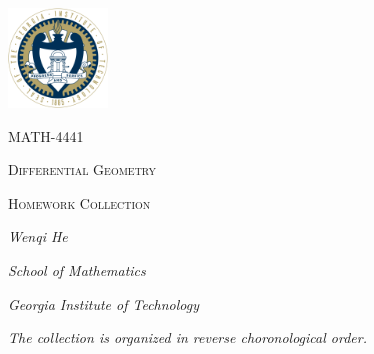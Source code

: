 \documentclass[10pt]{article}
\begin{document}
\begin{titlepage}
	\centering
	\par\vspace{5cm}
	\includegraphics[width=100px]{logo.png}\par
	\vspace{3cm}
	{\scshape\Large MATH-4441\par}
	{\Huge\scshape Differential Geometry \par}
	\vspace{0.3cm}
	{\scshape\LARGE Homework Collection \par}
	\vspace{2cm}
	\vfill
	{\itshape\Large Wenqi He\par}
	\vspace{0.3cm}
	{\itshape\Large School of Mathematics\par}	
	\vspace{0.3cm}
	{\itshape\Large Georgia Institute of Technology \par}
	\vfill
	{\large\itshape The collection is organized in reverse choronological order.}
\end{titlepage}
\end{document}
